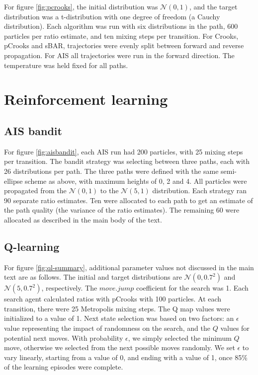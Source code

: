 For figure \ref{fig:pcrooks}, the initial distribution was $\mathcal{N}(0,1)$, and the target distribution was a t-distribution with one degree of freedom (a Cauchy distribution).
Each algorithm was run with six distributions in the path, 600 particles per ratio estimate, and ten mixing steps per transition.
For Crooks, pCrooks and sBAR, trajectories were evenly split between forward and reverse propagation. 
For AIS all trajectories were run in the forward direction.
The temperature was held fixed for all paths.



\section{Reinforcement learning} %
\label{sec:reinforcement_learning}

\subsection{AIS bandit} %
\label{sub:ais_bandit}

For figure \ref{fig:aisbandit}, each AIS run had 200 particles, with 25 mixing steps per transition.
The bandit strategy was selecting between three paths, each with 26 distributions per path. 
The three paths were defined with the same semi-ellipse scheme as above, with maximum heights of 0, 2 and 4.
All particles were propagated from the $\mathcal{N}(0,1)$ to the $\mathcal{N}(5,1)$ distribution.
Each strategy ran 90 separate ratio estimates. 
Ten were allocated to each path to get an estimate of the path quality (the variance of the ratio estimates). 
The remaining 60 were allocated as described in the main body of the text.

\subsection{Q-learning} %
\label{sub:q_learning}

For figure \ref{fig:ql-summary}, additional parameter values not discussed in the main text are as follows. 
The initial and target distributions are $\mathcal{N}(0,0.7^2)$ and $\mathcal{N}(5,0.7^2)$, respectively. 
The $move.jump$ coefficient for the search was 1.
Each search agent calculated ratios with pCrooks with 100 particles.
At each transition, there were 25 Metropolis mixing steps.
The Q map values were initialized to a value of 1.
Next state selection was based on two factors: an $\epsilon$ value representing the impact of randomness on the search, and the $Q$ values for potential next moves.
With probability $\epsilon$, we simply selected the minimum $Q$ move, otherwise we selected from the next possible moves randomly.
We set $\epsilon$ to vary linearly, starting from a value of 0, and ending with a value of 1, once 85\% of the learning episodes were complete.

